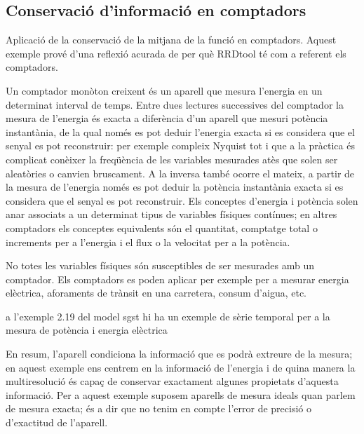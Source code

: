\subsection{Conservació d'informació en comptadors}
  \label{ex:multiresolucio:comptadors}

Aplicació de la conservació de la mitjana de la funció
  en comptadors.
  Aquest exemple prové d'una reflexió acurada de per què RRDtool té
  com a referent els comptadors.




  Un comptador monòton creixent és un aparell que mesura l'energia en
  un determinat interval de temps. Entre dues lectures successives del
  comptador la mesura de l'energia és exacta a diferència d'un aparell
  que mesuri potència instantània, de la qual només es pot deduir
  l'energia exacta si es considera que el senyal es pot reconstruir:
  per exemple compleix Nyquist tot i que a la pràctica és
  complicat conèixer la freqüència de les variables mesurades atès que
  solen ser aleatòries o canvien bruscament. A la inversa també ocorre
  el mateix, a partir de la mesura de l'energia només es pot deduir la
  potència instantània exacta si es considera que el senyal es pot
  reconstruir.  Els conceptes d'energia i potència solen anar
  associats a un determinat tipus de variables físiques contínues; en
  altres comptadors els conceptes equivalents són el quantitat,
  comptatge total o increments per a l'energia i el flux o la
  velocitat per a la potència.



  No totes les variables físiques són susceptibles de ser mesurades
  amb un comptador. Els comptadors es poden aplicar per exemple per a
  mesurar energia elèctrica, aforaments de trànsit en una carretera, consum
  d'aigua, etc.
  
   a l'exemple 2.19 %
 del model sgst hi ha un exemple de sèrie temporal per a la mesura de potència i energia elèctrica 


  En resum, l'aparell condiciona la informació que es podrà extreure
  de la mesura; en aquest exemple ens centrem en la informació de
  l'energia i de quina manera la multiresolució és capaç de conservar
  exactament algunes propietats d'aquesta informació.  Per a aquest
  exemple suposem aparells de mesura ideals quan parlem de mesura
  exacta; és a dir que no tenim en compte l'error de precisió o
  d'exactitud de l'aparell.

